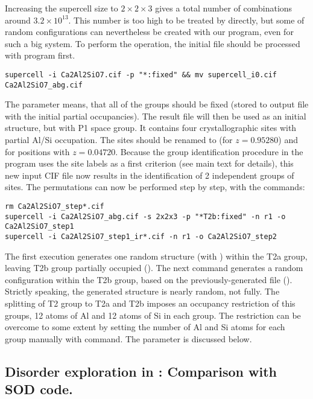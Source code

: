 \documentclass[a4paper,10pt]{article}
\begin{document}
Increasing the supercell size to $2\times2\times3$ gives a total number of combinations around $3.2 \times 10^{13}$. This number is too high to be treated by \sups{} directly, but some of random configurations can nevertheless be created with our program, even for such a big system. To perform the operation, the initial file should be processed with \sups{} program first.
\begin{Verbatim}[breaklines]
supercell -i Ca2Al2SiO7.cif -p "*:fixed" && mv supercell_i0.cif Ca2Al2SiO7_abg.cif
\end{Verbatim}
The parameter  means, that all of the groups should be fixed (stored to output file with the initial partial occupancies). The result file  will then be used as an initial structure, but with P1 space group. It contains four crystallographic sites with partial Al/Si occupation. The sites  should be renamed to  (for $z=0.95280$) and  for positions with $z=0.04720$. Because the group identification procedure in the \sups{} program uses the site labels as a first criterion (see main text for details), this new input CIF file now results in the identification of 2 independent groups of sites. The permutations can now be performed step by step, with the commands:
\begin{Verbatim}[breaklines]
rm Ca2Al2SiO7_step*.cif
supercell -i Ca2Al2SiO7_abg.cif -s 2x2x3 -p "*T2b:fixed" -n r1 -o Ca2Al2SiO7_step1 
supercell -i Ca2Al2SiO7_step1_ir*.cif -n r1 -o Ca2Al2SiO7_step2
\end{Verbatim}
The first \sups{} execution generates one random structure (with ) within the T2a group, leaving T2b group partially occupied (). The next command generates a random configuration within the T2b group, based on the previously-generated file (). Strictly speaking, the generated structure is nearly random, not fully. The splitting of T2 group to T2a and T2b imposes an occupancy restriction of this groups, 12 atoms of Al and 12 atoms of Si in each group. The restriction can be overcome to some extent by setting the number of Al and Si atoms for each group manually with  command. The parameter is discussed below.

\subsection*{Disorder exploration in : Comparison with SOD code.}
\end{document}
